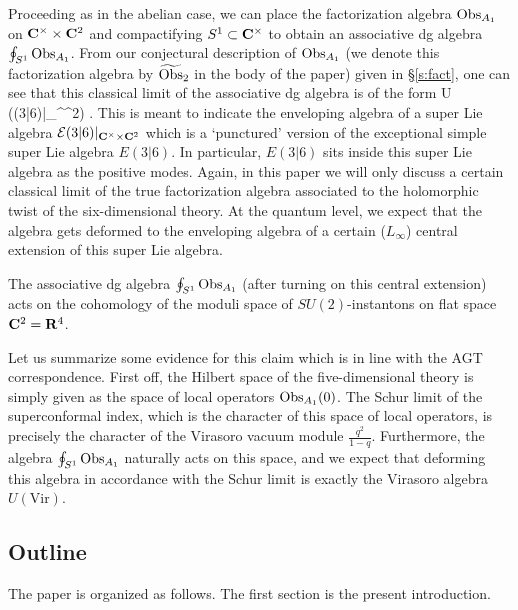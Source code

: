 \documentclass[11pt]{amsart}
\begin{document}
Proceeding as in the abelian case, we can place the factorization algebra $\operatorname{Obs}_{A_1}$ on $\mathbf{C}^\times \times \mathbf{C}^2$ and compactifying $S^1 \subset \mathbf{C}^\times$ to obtain an associative dg algebra $\oint_{S^1} \operatorname{Obs}_{A_1}$.
From our conjectural description of $\operatorname{Obs}_{A_1}$ (we denote this factorization algebra by $\widetilde{\operatorname{Obs}}_2$ in the body of the paper) given in \S \ref{s:fact}, one can see that this classical limit of the associative dg algebra is of the form
\beqn
U \left(\cE(3|6)|_{\C^\times \times \C^2}\right) .
\eeqn
This is meant to indicate the enveloping algebra of a super Lie algebra $\mathcal E(3|6)|_{\mathbf{C}^\times \times \mathbf{C}^2}$ which is a `punctured' version of the exceptional simple super Lie algebra $E(3|6)$. 
In particular, $E(3|6)$ sits inside this super Lie algebra as the positive modes.
Again, in this paper we will only discuss a certain classical limit of the true factorization algebra associated to the holomorphic twist of the six-dimensional theory. 
At the quantum level, we expect that the algebra gets deformed to the enveloping algebra of a certain ($L_\infty$) central extension of this super Lie algebra.

\begin{conj}
The associative dg algebra $\oint_{S^1} \operatorname{Obs}_{A_1}$ (after turning on this central extension) acts on the cohomology of the moduli space of $SU(2)$-instantons on flat space~$\mathbf{C}^2 = \mathbf{R}^4$. 
\end{conj}

Let us summarize some evidence for this claim which is in line with the AGT correspondence. 
First off, the Hilbert space of the five-dimensional theory is simply given as the space of local operators $\operatorname{Obs}_{A_1}(0)$.
The Schur limit of the superconformal index, which is the character of this space of local operators, is precisely the character of the Virasoro vacuum module $\frac{q^2}{1-q}$.
Furthermore, the algebra $\oint_{S^1} \operatorname{Obs}_{A_1}$ naturally acts on this space, and we expect that deforming this algebra in accordance with the Schur limit is exactly the Virasoro algebra $U(\text{Vir})$.

\subsection{Outline}

The paper is organized as follows. The first section is the present introduction.
\end{document}
